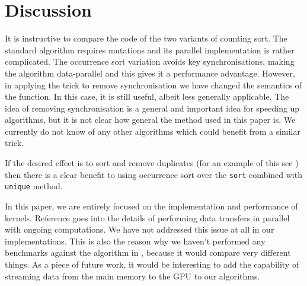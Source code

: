
\section {Discussion} 

It is instructive to compare the code of the two variants of counting
sort. The standard algorithm requires mutations and its parallel
implementation is rather complicated. The occurrence sort variation
avoids key synchronisations, making the algorithm
data-parallel and this gives it a performance advantage. However, in
applying the trick to remove synchronisation we have changed the
semantics of the function. In this case, it is still useful, albeit less
generally applicable. The idea of removing synchronisation is a
general and important idea for speeding up algorithms, but it is not
clear how general the method used in this paper is.  We currently do
not know of any other algorithms which could benefit from a similar
trick.

If the desired effect is to sort and remove duplicates 
(for an example of this see \cite{REMOVEDUPS}) then 
there is a clear benefit to using occurrence sort
over the {\tt sort} combined with {\tt unique} method. 

In this paper, we are entirely focused on the implementation and
performance of kernels. Reference \cite{CSORT} goes into the details
of performing data transfers in parallel with ongoing computations. We
have not addressed this issue at all in our implementations. This is
also the reason why we haven't performed any benchmarks against the algorithm in
\cite{CSORT}, because it would compare very different things. As a
piece of future work, it would be interesting to add the capability of
streaming data from the main memory to the GPU to our algorithms.

